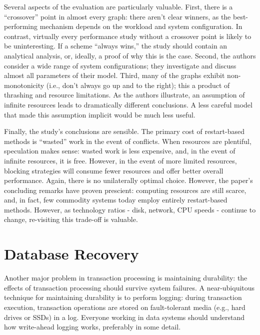 \documentclass[b5paper,11pt,twoside,openright]{book}
\newcommand\Section[2]{
  \hypertarget{#1}{
    \section{#2}\label{#1}
  }
}
\begin{document}
Several aspects of the evaluation are particularly valuable. First,
there is a ``crossover'' point in almost every graph: there aren't clear
winners, as the best-performing mechanism depends on the workload and
system configuration. In contrast, virtually every performance study
without a crossover point is likely to be uninteresting. If a scheme
``always wins,'' the study should contain an analytical analysis, or,
ideally, a proof of why this is the case. Second, the authors consider a
wide range of system configurations; they investigate and discuss almost
all parameters of their model. Third, many of the graphs exhibit
non-monotonicity (i.e., don't always go up and to the right); this a
product of thrashing and resource limitations. As the authors
illustrate, an assumption of infinite resources leads to dramatically
different conclusions. A less careful model that made this assumption
implicit would be much less useful.

Finally, the study's conclusions are sensible. The primary cost of
restart-based methods is ``wasted'' work in the event of conflicts. When
resources are plentiful, speculation makes sense: wasted work is less
expensive, and, in the event of infinite resources, it is free. However,
in the event of more limited resources, blocking strategies will consume
fewer resources and offer better overall performance. Again, there is no
unilaterally optimal choice. However, the paper's concluding remarks
have proven prescient: computing resources are still scarce, and, in
fact, few commodity systems today employ entirely restart-based methods.
However, as technology ratios - disk, network, CPU speeds - continue to
change, re-visiting this trade-off is valuable.

\Section{database-recovery}{%
Database Recovery
}

Another major problem in transaction processing is maintaining
durability: the effects of transaction processing should survive system
failures. A near-ubiquitous technique for maintaining durability is to
perform logging: during transaction execution, transaction operations
are stored on fault-tolerant media (e.g., hard drives or SSDs) in a log.
Everyone working in data systems should understand how write-ahead
logging works, preferably in some detail.
\end{document}
